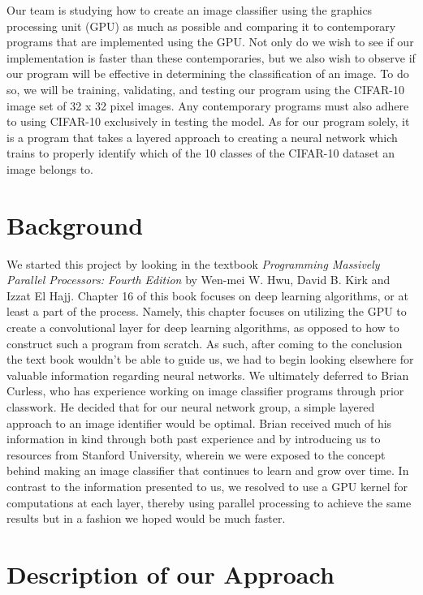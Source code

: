 \documentclass[conference]{IEEEtran}
\begin{document}
Our team is studying how to create an image classifier using the graphics processing unit (GPU) as much as possible and comparing it to contemporary programs that are implemented using the GPU. Not only do we wish to see if our implementation is faster than these contemporaries, but we also wish to observe if our program will be effective in determining the classification of an image. To do so, we will be training, validating, and testing our program using the CIFAR-10 image set of 32 x 32 pixel images. Any contemporary programs must also adhere to using CIFAR-10 exclusively in testing the model. As for our program solely, it is a program that takes a layered approach to creating a neural network which trains to properly identify which of the 10 classes of the CIFAR-10 dataset an image belongs to.

\section{Background}

We started this project by looking in the textbook \textit{Programming Massively Parallel Processors: Fourth Edition} by Wen-mei W. Hwu, David B. Kirk and Izzat El Hajj\cite{b1}. Chapter 16 of this book focuses on deep learning algorithms, or at least a part of the process. Namely, this chapter focuses on utilizing the GPU to create a convolutional layer for deep learning algorithms, as opposed to how to construct such a program from scratch. As such, after coming to the conclusion the text book wouldn't be able to guide us, we had to begin looking elsewhere for valuable information regarding neural networks. We ultimately deferred to Brian Curless, who has experience working on image classifier programs through prior classwork. He decided that for our neural network group, a simple layered approach to an image identifier would be optimal. Brian received much of his information in kind through both past experience and by introducing us to resources from Stanford University\cite{b3}, wherein we were exposed to the concept behind making an image classifier that continues to learn and grow over time. In contrast to the information presented to us, we resolved to use a GPU kernel for computations at each layer, thereby using parallel processing to achieve the same results but in a fashion we hoped would be much faster.

\section{Description of our Approach}
\end{document}
